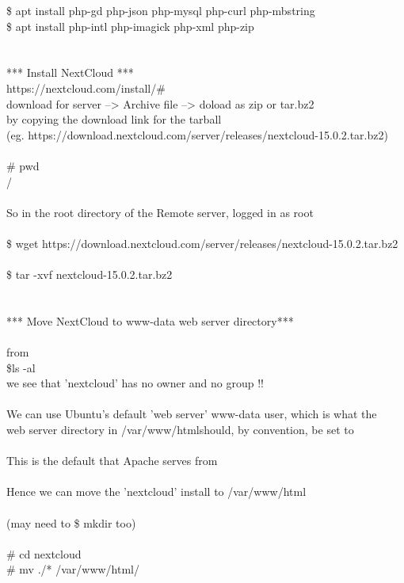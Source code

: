\documentclass[10pt,a4paper]{article}
\begin{document}
{	\$ apt install php-gd php-json php-mysql php-curl php-mbstring\\
	\$ apt install php-intl php-imagick php-xml php-zip\\
\\
\\
*** Install NextCloud ***\\
	https://nextcloud.com/install/\#}{\large \\
	download for server --> Archive file --> doload as zip or tar.bz2 \\
	by copying the download link for the tarball \\
	(eg. https://download.nextcloud.com/server/releases/nextcloud-15.0.2.tar.bz2}{\large  )\\
\\
	\# pwd \\
	/\\
\\
	So in the root directory of the Remote server, logged in as root\\
\\
	\$ wget https://download.nextcloud.com/server/releases/nextcloud-15.0.2.tar.bz2}{\large \\
\\
	\$ tar -xvf nextcloud-15.0.2.tar.bz2\\
\\
\\
*** Move NextCloud to www-data web server directory***\\
\\
	from \\
	\$ls -al\\
	we see that 'nextcloud' has no owner and no group !!\\
\\
	We can use Ubuntu's default 'web server' www-data user, which is what the \\
	web server directory in /var/www/html}{\large  should, by convention, be set to\\
\\
	This is the default that Apache serves from\\
\\
	Hence we can move the 'nextcloud' install to /var/www/html}{\large \\
\\
	(may need to \$ mkdir too)\\
 \\
	\# cd nextcloud\\
	\# mv ./* /var/www/html/}{\large \\
}
\end{document}

